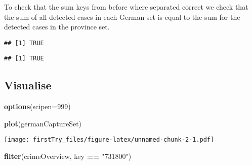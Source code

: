 \documentclass[
]{article}
\newenvironment{Shaded}{\begin{snugshade}}{\end{snugshade}}
\newcommand{\DataTypeTok}[1]{\textcolor[rgb]{0.13,0.29,0.53}{#1}}
\newcommand{\DecValTok}[1]{\textcolor[rgb]{0.00,0.00,0.81}{#1}}
\newcommand{\KeywordTok}[1]{\textcolor[rgb]{0.13,0.29,0.53}{\textbf{#1}}}
\newcommand{\NormalTok}[1]{#1}
\newcommand{\OperatorTok}[1]{\textcolor[rgb]{0.81,0.36,0.00}{\textbf{#1}}}
\newcommand{\StringTok}[1]{\textcolor[rgb]{0.31,0.60,0.02}{#1}}
\begin{document}
To check that the sum keys from before where separated correct we check
that the sum of all detected cases in each German set is equal to the
sum for the detected cases in the province set.

\begin{Shaded}
\end{Shaded}

\begin{verbatim}
## [1] TRUE
\end{verbatim}

\begin{Shaded}
\end{Shaded}

\begin{verbatim}
## [1] TRUE
\end{verbatim}

\hypertarget{visualise}{%
\subsection{Visualise}\label{visualise}}

\begin{Shaded}
\begin{Highlighting}[]
\KeywordTok{options}\NormalTok{(}\DataTypeTok{scipen=}\DecValTok{999}\NormalTok{)}
\end{Highlighting}
\end{Shaded}

\begin{Shaded}
\begin{Highlighting}[]
\KeywordTok{plot}\NormalTok{(germanCaptureSet)}
\end{Highlighting}
\end{Shaded}

\texttt{[image: firstTry\_files/figure-latex/unnamed-chunk-2-1.pdf]}

\begin{Shaded}
\begin{Highlighting}[]
\KeywordTok{filter}\NormalTok{(crimeOverview, key }\OperatorTok{==}\StringTok{ "731800"}\NormalTok{)}
\end{Highlighting}
\end{Shaded}
\end{document}
